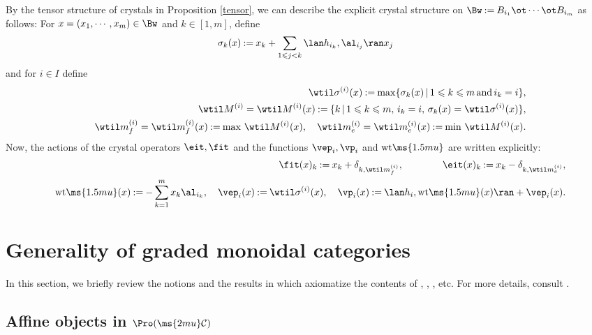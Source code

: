 \documentclass[12pt,leqno]{amsart}%
\renewcommand{\le}{\leqslant}
\renewcommand{\leq}{\le}
\theoremstyle{plain}
\theoremstyle{definition}
\newcommand{\seteq}{\mathbin{:=}}
\newcommand{\wt}{\mathrm{wt}\ms{1.5mu}} 		%
\newcommand{\shc}{{\ms{2mu}\mathcal{C}}}
\def\del{\delta}
\def\TY(#1,#2,#3){#1^{(#2)}_{#3}}
\def\qq{\qquad}
\def\q{\quad}
\numberwithin{equation}{section}
\begin{document}
By the tensor structure of crystals 
in Proposition \ref{tensor},
we can describe 
the explicit crystal structure on $\Bw\seteq B_{i_1}\ot \cdots\ot B_{i_m}$ 
as follows: 
For $x=(x_1,\cdots,x_m)\in \Bw$ and $k\in[1,m]$, define
\begin{equation*}
 \sigma_k(x)\seteq x_k+\sum_{1\leq j<k}\lan h_{i_k},\al_{i_j}\ran x_j
\label{sigma-def}
\end{equation*}
and for $i\in I$ define
\begin{eqnarray}
&&\TY(\wtil\sigma,i,)(x)\seteq\max\{\sigma_k(x)\,|\,1\leq k\leq m\,{\rm and}\,
i_k=i\},\label{simgak}\\
&&\TY(\wtil M,i,)=\TY(\wtil M,i,)(x)\seteq\{k\,|\,1\leq k\leq m,\,i_k=i,\,
\sigma_k(x)=\TY(\wtil\sigma,i,)(x)\},
\label{Mi}
\\
&&
\TY(\wtil m,i,f)=\TY(\wtil m,i,f)(x)\seteq\max\,\TY(\wtil M,i,)(x),\q
\TY(\wtil m,i,e)=\TY(\wtil m,i,e)(x)\seteq\min\,\TY(\wtil M,i,)(x).
\label{mfme}
\end{eqnarray}
Now, the actions of the crystal operators $\eit,\fit$ and the functions
$\vep_i,\vp_i$ 
and $\wt$  are written explicitly:
\begin{eqnarray}
&& \fit(x)_k\seteq x_k+\del_{k,\TY(\wtil m,i,f)},\qq\qq
\eit(x)_k\seteq x_k-\del_{k,\TY(\wtil m,i,e)},\\
&&
\wt(x)\seteq-\sum_{k=1}^m x_k\al_{i_k},\quad
\vep_i(x)\seteq \TY(\wtil\sigma,i,)(x),\quad
\vp_i(x)\seteq\lan h_i,\wt(x)\ran+\vep_i(x).
\label{wt-vep-vp-ify}
\end{eqnarray}


\section{Generality of graded monoidal categories}
In this section, we briefly review the notions and the results
in \cite{ref} which axiomatize the contents of \cite{KKKO15}, \cite{KKKO18},
\cite{KKOP18}, etc.  For more details, consult \cite{ref}.

\subsection{Affine objects in $\Pro(\shc)$} 
\end{document}
